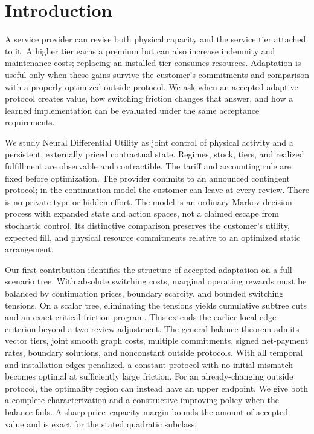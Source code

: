 \documentclass[11pt,letterpaper]{article}
\theoremstyle{definition}
\newcommand{\1}{\mathbf 1}
\begin{document}
\section{Introduction}
A service provider can revise both physical capacity and the service tier attached to it. A higher tier earns a premium but can also increase indemnity and maintenance costs; replacing an installed tier consumes resources. Adaptation is useful only when these gains survive the customer's commitments and comparison with a properly optimized outside protocol. We ask when an accepted adaptive protocol creates value, how switching friction changes that answer, and how a learned implementation can be evaluated under the same acceptance requirements.

We study Neural Differential Utility as joint control of physical activity and a persistent, externally priced contractual state. Regimes, stock, tiers, and realized fulfillment are observable and contractible. The tariff and accounting rule are fixed before optimization. The provider commits to an announced contingent protocol; in the continuation model the customer can leave at every review. There is no private type or hidden effort. The model is an ordinary Markov decision process with expanded state and action spaces, not a claimed escape from stochastic control. Its distinctive comparison preserves the customer's utility, expected fill, and physical resource commitments relative to an optimized static arrangement.

Our first contribution identifies the structure of accepted adaptation on a full scenario tree. With absolute switching costs, marginal operating rewards must be balanced by continuation prices, boundary scarcity, and bounded switching tensions. On a scalar tree, eliminating the tensions yields cumulative subtree cuts and an exact critical-friction program. This extends the earlier local edge criterion beyond a two-review adjustment. The general balance theorem admits vector tiers, joint smooth graph costs, multiple commitments, signed net-payment rates, boundary solutions, and nonconstant outside protocols. With all temporal and installation edges penalized, a constant protocol with no initial mismatch becomes optimal at sufficiently large friction. For an already-changing outside protocol, the optimality region can instead have an upper endpoint. We give both a complete characterization and a constructive improving policy when the balance fails. A sharp price--capacity margin bounds the amount of accepted value and is exact for the stated quadratic subclass.
\end{document}
